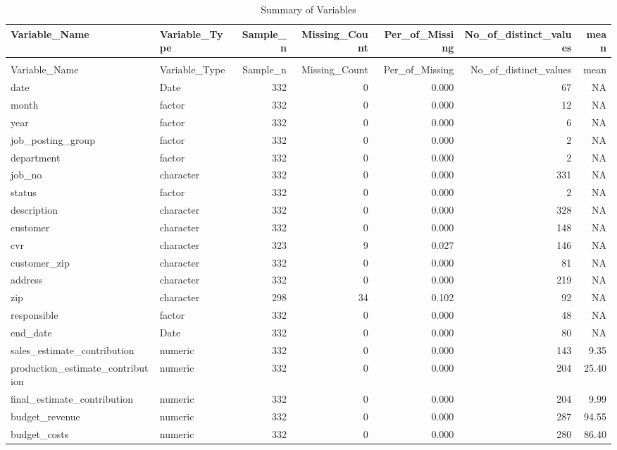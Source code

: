 \begingroup\fontsize{9}{11}\selectfont

\begin{landscape}
\begin{longtable}[t]{llrrrrr}
\caption{Summary of Variables}\\
\toprule
Variable\_Name & Variable\_Type & Sample\_n & Missing\_Count & Per\_of\_Missing & No\_of\_distinct\_values & mean\\
\midrule
\endfirsthead
\caption[]{Summary of Variables }\\
\toprule
Variable\_Name & Variable\_Type & Sample\_n & Missing\_Count & Per\_of\_Missing & No\_of\_distinct\_values & mean\\
\midrule
\endhead

\endfoot
\bottomrule
\endlastfoot
date & Date & 332 & 0 & 0.000 & 67 & NA\\
month & factor & 332 & 0 & 0.000 & 12 & NA\\
year & factor & 332 & 0 & 0.000 & 6 & NA\\
job\_posting\_group & factor & 332 & 0 & 0.000 & 2 & NA\\
department & factor & 332 & 0 & 0.000 & 2 & NA\\
job\_no & character & 332 & 0 & 0.000 & 331 & NA\\
status & factor & 332 & 0 & 0.000 & 2 & NA\\
description & character & 332 & 0 & 0.000 & 328 & NA\\
customer & character & 332 & 0 & 0.000 & 148 & NA\\
cvr & character & 323 & 9 & 0.027 & 146 & NA\\
customer\_zip & character & 332 & 0 & 0.000 & 81 & NA\\
address & character & 332 & 0 & 0.000 & 219 & NA\\
zip & character & 298 & 34 & 0.102 & 92 & NA\\
responsible & factor & 332 & 0 & 0.000 & 48 & NA\\
end\_date & Date & 332 & 0 & 0.000 & 80 & NA\\
sales\_estimate\_contribution & numeric & 332 & 0 & 0.000 & 143 & 9.35\\
production\_estimate\_contribution & numeric & 332 & 0 & 0.000 & 204 & 25.40\\
final\_estimate\_contribution & numeric & 332 & 0 & 0.000 & 204 & 9.99\\
budget\_revenue & numeric & 332 & 0 & 0.000 & 287 & 94.55\\
budget\_costs & numeric & 332 & 0 & 0.000 & 280 & 86.40\\

\end{longtable}
\end{landscape}
